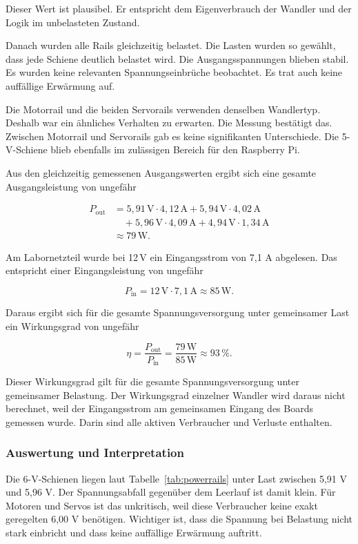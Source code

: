 Dieser Wert ist plausibel. Er entspricht dem Eigenverbrauch der Wandler und der Logik im unbelasteten Zustand.

Danach wurden alle Rails gleichzeitig belastet. Die Lasten wurden so gewählt, dass jede Schiene deutlich belastet wird. Die Ausgangsspannungen blieben stabil. Es wurden keine relevanten Spannungseinbrüche beobachtet. Es trat auch keine auffällige Erwärmung auf.

Die Motorrail und die beiden Servorails verwenden denselben Wandlertyp. Deshalb war ein ähnliches Verhalten zu erwarten. Die Messung bestätigt das. Zwischen Motorrail und Servorails gab es keine signifikanten Unterschiede. Die 5-V-Schiene blieb ebenfalls im zulässigen Bereich für den Raspberry Pi.

Aus den gleichzeitig gemessenen Ausgangswerten ergibt sich eine gesamte Ausgangsleistung von ungefähr

\[
\begin{aligned}
P_\mathrm{out} &= 5{,}91\,\mathrm{V} \cdot 4{,}12\,\mathrm{A}
	+ 5{,}94\,\mathrm{V} \cdot 4{,}02\,\mathrm{A} \\
&\quad + 5{,}96\,\mathrm{V} \cdot 4{,}09\,\mathrm{A}
	+ 4{,}94\,\mathrm{V} \cdot 1{,}34\,\mathrm{A} \\
&\approx 79\,\mathrm{W}.
\end{aligned}
\]

Am Labornetzteil wurde bei 12\,V ein Eingangsstrom von 7,1 A abgelesen. Das entspricht einer Eingangsleistung von ungefähr

\[
P_\mathrm{in} = 12\,\mathrm{V} \cdot 7{,}1\,\mathrm{A} \approx 85\,\mathrm{W}.
\]

Daraus ergibt sich für die gesamte Spannungsversorgung unter gemeinsamer Last ein Wirkungsgrad von ungefähr

\[
\eta = \frac{P_\mathrm{out}}{P_\mathrm{in}} = \frac{79\,\mathrm{W}}{85\,\mathrm{W}} \approx 93\,\%.
\]

Dieser Wirkungsgrad gilt für die gesamte Spannungsversorgung unter gemeinsamer Belastung. Der Wirkungsgrad einzelner Wandler wird daraus nicht berechnet, weil der Eingangsstrom am gemeinsamen Eingang des Boards gemessen wurde. Darin sind alle aktiven Verbraucher und Verluste enthalten.


\subsubsection{Auswertung und Interpretation}
Die 6-V-Schienen liegen laut Tabelle~\ref{tab:powerrails} unter Last zwischen 5,91 V und 5,96 V. Der Spannungsabfall gegenüber dem Leerlauf ist damit klein. Für Motoren und Servos ist das unkritisch, weil diese Verbraucher keine exakt geregelten 6,00 V benötigen. Wichtiger ist, dass die Spannung bei Belastung nicht stark einbricht und dass keine auffällige Erwärmung auftritt.

